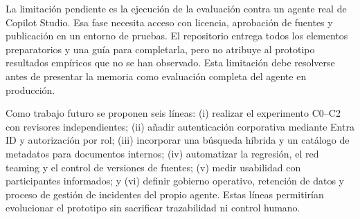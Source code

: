 La limitaci\'on pendiente es la ejecuci\'on de la evaluaci\'on contra un agente real de Copilot Studio. Esa fase necesita acceso con licencia, aprobaci\'on de fuentes y publicaci\'on en un entorno de pruebas. El repositorio entrega todos los elementos preparatorios y una gu\'ia para completarla, pero no atribuye al prototipo resultados emp\'iricos que no se han observado. Esta limitaci\'on debe resolverse antes de presentar la memoria como evaluaci\'on completa del agente en producci\'on.

Como trabajo futuro se proponen seis l\'ineas: (i) realizar el experimento C0--C2 con revisores independientes; (ii) a\~nadir autenticaci\'on corporativa mediante Entra ID y autorizaci\'on por rol; (iii) incorporar una b\'usqueda h\'ibrida y un cat\'alogo de metadatos para documentos internos; (iv) automatizar la regresi\'on, el red teaming y el control de versiones de fuentes; (v) medir usabilidad con participantes informados; y (vi) definir gobierno operativo, retenci\'on de datos y proceso de gesti\'on de incidentes del propio agente. Estas l\'ineas permitir\'ian evolucionar el prototipo sin sacrificar trazabilidad ni control humano.
